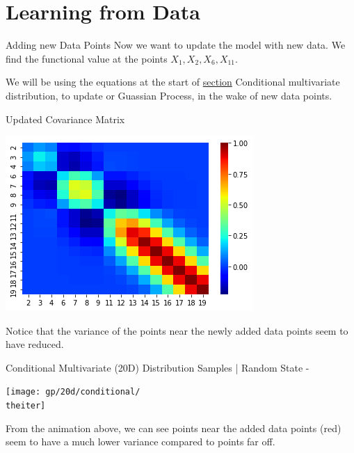 \documentclass{beamer}
\begin{document}
	\section{Learning from Data}
	
	\begin{frame}{Adding new Data Points}
		Now we want to update the model with new data. We find the functional value at the points $X_1, X_2, X_6, X_{11}$.
		
		We will be using the equations at the start of \hyperref[sec:condMul]{section} Conditional multivariate distribution, to update or Guassian Process, in the wake of new data points.
	\end{frame}
	
	\begin{frame}{Updated Covariance Matrix}
		\begin{center}
			\includegraphics[width=\linewidth, height=\textheight -120pt ,keepaspectratio]{gp/post20d}
		\end{center}
		Notice that the variance of the points near the newly added data points seem to have reduced.
	\end{frame}
	
	{%
		\begin{frame}{Conditional Multivariate (20D) Distribution Samples | Random State - \theiter}
			\begin{center}
				\texttt{[image: gp/20d/conditional/\\theiter]}
			\end{center}
			From the animation above, we can see points near the added data points (red) seem to have a much lower variance compared to points far off.
		\end{frame}
	}
	
\end{document}
